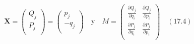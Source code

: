 \documentclass[a4paper]{article}
\begin{document}
\begin{answer}[Punto 3]
            \begin{align*}
                \mathbf X = \begin{pmatrix}
                    Q_j\\
                    P_j\\
                \end{pmatrix} = \begin{pmatrix}
                    p_j\\
                    -q_j\\
                \end{pmatrix}
                \quad \text{y} \quad 
                M = \begin{pmatrix}
                    \frac{\partial Q_j}{\partial q_i} & \frac{\partial Q_j}{\partial p_i}\\
                    \frac{\partial P_j}{\partial q_i} & \frac{\partial P_j}{\partial p_i}\\
                \end{pmatrix} \quad (17.4)
            \end{align*}
       


\end{answer}
\end{document}
